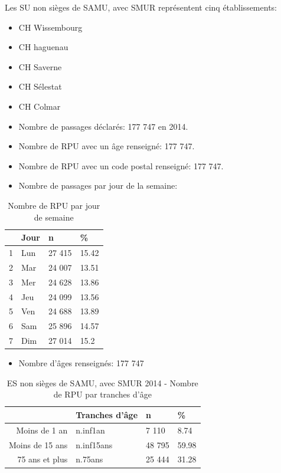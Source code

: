 \documentclass[]{article}
\begin{document}
Les SU non sièges de SAMU, avec SMUR représentent cinq établissements:

\begin{itemize}
\item
  CH Wissembourg
\item
  CH haguenau
\item
  CH Saverne
\item
  CH Sélestat
\item
  CH Colmar
\item
  Nombre de passages déclarés: 177 747 en 2014.
\item
  Nombre de RPU avec un âge renseigné: 177 747.
\item
  Nombre de RPU avec un code postal renseigné: 177 747.
\item
  Nombre de passages par jour de la semaine:
\end{itemize}

\begin{table}[ht]
\centering
\begin{tabular}{rlll}
  \hline
 & Jour & n & \% \\ 
  \hline
1 & Lun & 27 415 & 15.42 \\ 
  2 & Mar & 24 007 & 13.51 \\ 
  3 & Mer & 24 628 & 13.86 \\ 
  4 & Jeu & 24 099 & 13.56 \\ 
  5 & Ven & 24 688 & 13.89 \\ 
  6 & Sam & 25 896 & 14.57 \\ 
  7 & Dim & 27 014 & 15.2 \\ 
   \hline
\end{tabular}
\caption{Nombre de RPU par jour de semaine} 
\end{table}

\begin{itemize}
\itemsep1pt\parskip0pt
\item
  Nombre d'âges renseignés: 177 747
\end{itemize}

\begin{table}[ht]
\centering
\begin{tabular}{rlll}
  \hline
 & Tranches d'âge & n & \% \\ 
  \hline
Moins de 1 an & n.inf1an &  7 110 & 8.74 \\ 
  Moins de 15 ans & n.inf15ans & 48 795 & 59.98 \\ 
  75 ans et plus & n.75ans & 25 444 & 31.28 \\ 
   \hline
\end{tabular}
\caption{ES non sièges de SAMU, avec SMUR 2014 - Nombre de RPU par tranches d'âge} 
\end{table}
\end{document}
